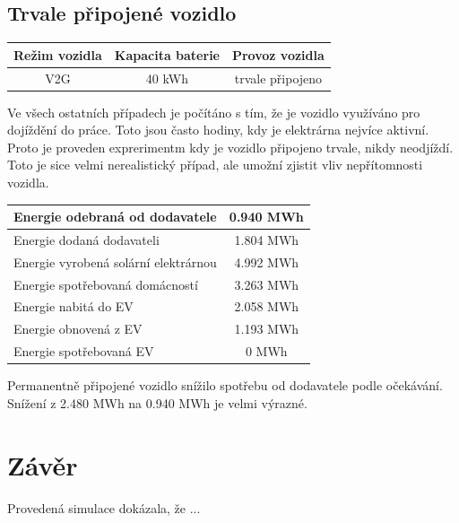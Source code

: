 \documentclass[12pt,a4paper]{article}
\begin{document}
\subsection{Trvale připojené vozidlo}

\bigskip
\begin{tabular}{ | c | c | c | }
\hline
Režim vozidla & Kapacita baterie & Provoz vozidla \\
\hline
V2G & 40 kWh & trvale připojeno \\
\hline
\end{tabular}
\bigskip

Ve všech ostatních případech je počítáno s tím, že je vozidlo využíváno pro dojíždění do práce.
Toto jsou často hodiny, kdy je elektrárna nejvíce aktivní.
Proto je proveden exprerimentm kdy je vozidlo připojeno trvale, nikdy neodjíždí.
Toto je sice velmi nerealistický případ, ale umožní zjistit vliv nepřítomnosti vozidla.

\bigskip
\begin{tabular}{ | l | c | }
\hline
Energie odebraná od dodavatele & 0.940 MWh \\
\hline
Energie dodaná dodavateli & 1.804 MWh \\
\hline
Energie vyrobená solární elektrárnou & 4.992 MWh \\
\hline
Energie spotřebovaná domácností & 3.263 MWh \\
\hline
Energie nabitá do EV & 2.058 MWh \\
\hline
Energie obnovená z EV & 1.193 MWh \\
\hline
Energie spotřebovaná EV & 0 MWh \\
\hline
\end{tabular}
\bigskip

Permanentně připojené vozidlo snížilo spotřebu od dodavatele podle očekávání.
Snížení z 2.480 MWh na 0.940 MWh je velmi výrazné.


\section{Závěr}

Provedená simulace dokázala, že ...

\printbibliography
\end{document}
